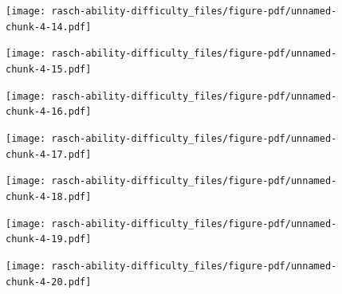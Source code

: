 \documentclass[
  letterpaper,
  DIV=11,
  numbers=noendperiod]{scrreprt}
\begin{document}
\begin{figure}[H]

{\centering \texttt{[image: rasch-ability-difficulty\_files/figure-pdf/unnamed-chunk-4-14.pdf]}

}

\end{figure}

\begin{figure}[H]

{\centering \texttt{[image: rasch-ability-difficulty\_files/figure-pdf/unnamed-chunk-4-15.pdf]}

}

\end{figure}

\begin{figure}[H]

{\centering \texttt{[image: rasch-ability-difficulty\_files/figure-pdf/unnamed-chunk-4-16.pdf]}

}

\end{figure}

\begin{figure}[H]

{\centering \texttt{[image: rasch-ability-difficulty\_files/figure-pdf/unnamed-chunk-4-17.pdf]}

}

\end{figure}

\begin{figure}[H]

{\centering \texttt{[image: rasch-ability-difficulty\_files/figure-pdf/unnamed-chunk-4-18.pdf]}

}

\end{figure}

\begin{figure}[H]

{\centering \texttt{[image: rasch-ability-difficulty\_files/figure-pdf/unnamed-chunk-4-19.pdf]}

}

\end{figure}

\begin{figure}[H]

{\centering \texttt{[image: rasch-ability-difficulty\_files/figure-pdf/unnamed-chunk-4-20.pdf]}

}

\end{figure}
\end{document}
